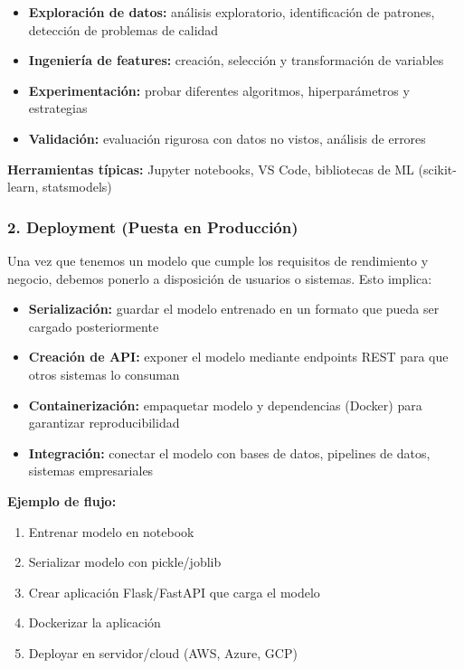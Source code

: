 \documentclass[11pt,a4paper]{article}
\begin{document}
\begin{itemize}
\item \textbf{Exploración de datos:} análisis exploratorio, identificación de patrones, detección de problemas de calidad
\item \textbf{Ingeniería de features:} creación, selección y transformación de variables
\item \textbf{Experimentación:} probar diferentes algoritmos, hiperparámetros y estrategias
\item \textbf{Validación:} evaluación rigurosa con datos no vistos, análisis de errores
\end{itemize}

\textbf{Herramientas típicas:} Jupyter notebooks, VS Code, bibliotecas de ML (scikit-learn, statsmodels)

\subsubsection{2. Deployment (Puesta en Producción)}

Una vez que tenemos un modelo que cumple los requisitos de rendimiento y negocio, debemos ponerlo a disposición de usuarios o sistemas. Esto implica:

\begin{itemize}
\item \textbf{Serialización:} guardar el modelo entrenado en un formato que pueda ser cargado posteriormente
\item \textbf{Creación de API:} exponer el modelo mediante endpoints REST para que otros sistemas lo consuman
\item \textbf{Containerización:} empaquetar modelo y dependencias (Docker) para garantizar reproducibilidad
\item \textbf{Integración:} conectar el modelo con bases de datos, pipelines de datos, sistemas empresariales
\end{itemize}

\textbf{Ejemplo de flujo:}
\begin{enumerate}
\item Entrenar modelo en notebook
\item Serializar modelo con pickle/joblib
\item Crear aplicación Flask/FastAPI que carga el modelo
\item Dockerizar la aplicación
\item Deployar en servidor/cloud (AWS, Azure, GCP)
\end{enumerate}
\end{document}
